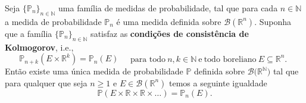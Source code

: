 \begin{teorema}
Seja $\{\mathbb{P}_n\}_{n\in\mathbb{N}}$ 
uma família de medidas de probabilidade, 
tal que para cada $n\in\mathbb{N}$ a
medida de probabilidade $\mathbb{P}_n$ é uma medida definida 
sobre $\mathscr{B}(\mathbb{R}^{n})$. 
Suponha que a família $\{\mathbb{P}_n\}_{n\in\mathbb{N}}$  
satisfaz as 
\textbf{condições de consistência de Kolmogorov}, i.e.,
\[
\mathbb{P}_{n+k}(E\times\mathbb{R}^k)
=
\mathbb{P}_n(E)
\quad
\begin{array}{c}
\text{para todo}\ n,k\in\mathbb{N}\ \text{e}\ 
\text{todo boreliano}\ E\subseteq \mathbb{R}^n.
\end{array}
\]
Então existe uma única medida de probabilidade 
$\mathbb{P}$ definida sobre 
$\mathscr{B}\big(\mathbb{R}^{\mathbb{N}}\big)$
tal que para qualquer que seja $n\geq 1$ e 
$E\in \mathscr{B}(\mathbb{R}^{n})$ temos 
a seguinte igualdade 
\[
\mathbb{P}(E\times\mathbb{R}\times\mathbb{R}\times\ldots)
=
\mathbb{P}_n(E).
\]
\end{teorema}




